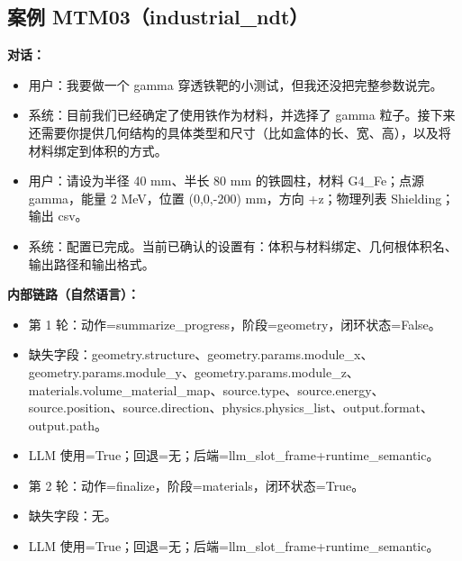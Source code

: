 \documentclass[11pt]{ctexart}
\begin{document}
\subsection{案例 MTM03（industrial\_ndt）}
\textbf{对话：}
\begin{itemize}
\item 用户：我要做一个 gamma 穿透铁靶的小测试，但我还没把完整参数说完。
\item 系统：目前我们已经确定了使用铁作为材料，并选择了 gamma 粒子。接下来还需要你提供几何结构的具体类型和尺寸（比如盒体的长、宽、高），以及将材料绑定到体积的方式。
\item 用户：请设为半径 40 mm、半长 80 mm 的铁圆柱，材料 G4\_Fe；点源 gamma，能量 2 MeV，位置 (0,0,-200) mm，方向 +z；物理列表 Shielding；输出 csv。
\item 系统：配置已完成。当前已确认的设置有：体积与材料绑定、几何根体积名、输出路径和输出格式。
\end{itemize}
\textbf{内部链路（自然语言）：}
\begin{itemize}
\item 第 1 轮：动作=summarize\_progress，阶段=geometry，闭环状态=False。
\item 缺失字段：geometry.structure、geometry.params.module\_x、geometry.params.module\_y、geometry.params.module\_z、materials.volume\_material\_map、source.type、source.energy、source.position、source.direction、physics.physics\_list、output.format、output.path。
\item LLM 使用=True；回退=无；后端=llm\_slot\_frame+runtime\_semantic。
\item 第 2 轮：动作=finalize，阶段=materials，闭环状态=True。
\item 缺失字段：无。
\item LLM 使用=True；回退=无；后端=llm\_slot\_frame+runtime\_semantic。
\end{itemize}
\end{document}

